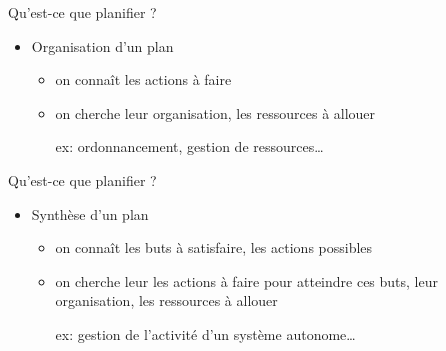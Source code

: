 \documentclass[compress]{beamer}
\begin{document}
\begin{frame}{Qu'est-ce que planifier ?}
\begin{itemize}
\item {} Organisation d'un plan
	\begin{itemize}
	\item on connaît les actions à faire
	\item on cherche leur organisation, les ressources à allouer
	\item[ex:] ordonnancement, gestion de ressources\dots
	\end{itemize}
\end{itemize}
\begin{center}
\end{center}
\end{frame}

\begin{frame}{Qu'est-ce que planifier ?}
\begin{itemize}
\item {} Synthèse d'un plan
	\begin{itemize}
	\item on connaît les buts à satisfaire, les actions possibles
	\item on cherche leur les actions à faire pour atteindre ces buts, 
		leur organisation, les ressources à allouer
	\item[ex:] gestion de l'activité d'un système autonome\dots
	\end{itemize}
\end{itemize}
\end{frame}
\end{document}
